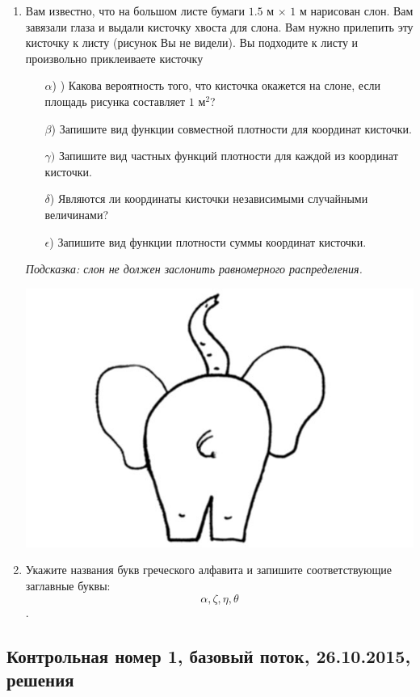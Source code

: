 \begin{enumerate}
\item
Вам известно, что на большом листе бумаги $1.5$ м $\times$ $1$ м нарисован слон. Вам завязали
глаза и выдали кисточку хвоста для слона. Вам нужно прилепить эту кисточку к
листу (рисунок Вы не видели). Вы подходите к листу и произвольно приклеиваете
кисточку
\begin{enumerate}
    \item[$\alpha$)] ) Какова вероятность того, что кисточка окажется на слоне, если площадь рисунка составляет $1$ м$^2$?
    \item[$\beta$)]  Запишите вид функции совместной плотности для координат кисточки.
    \item[$\gamma)$] Запишите вид частных функций плотности для каждой из координат кисточки.
    \item[$\delta$)] Являются ли координаты кисточки независимыми случайными величинами?
    \item[$\epsilon$)] Запишите вид функции плотности суммы координат кисточки.
\end{enumerate}
\textit{Подсказка: слон не должен заслонить равномерного распределения.}

\begin{center}
\includegraphics[scale=1.5]{images/slon.jpg}
\end{center}

\item
Укажите названия букв греческого алфавита и запишите соответствующие заглавные буквы:
\[\alpha, \zeta, \eta, \theta\].

\end{enumerate}

\subsection{Контрольная номер 1, базовый поток, 26.10.2015, решения}

